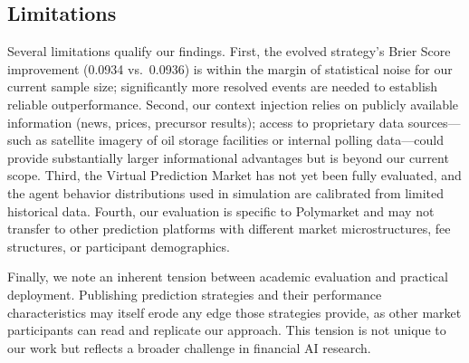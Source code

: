\subsection{Limitations}

Several limitations qualify our findings. First, the evolved strategy's Brier Score improvement (0.0934 vs.\ 0.0936) is within the margin of statistical noise for our current sample size; significantly more resolved events are needed to establish reliable outperformance. Second, our context injection relies on publicly available information (news, prices, precursor results); access to proprietary data sources---such as satellite imagery of oil storage facilities or internal polling data---could provide substantially larger informational advantages but is beyond our current scope. Third, the Virtual Prediction Market has not yet been fully evaluated, and the agent behavior distributions used in simulation are calibrated from limited historical data. Fourth, our evaluation is specific to Polymarket and may not transfer to other prediction platforms with different market microstructures, fee structures, or participant demographics.

Finally, we note an inherent tension between academic evaluation and practical deployment. Publishing prediction strategies and their performance characteristics may itself erode any edge those strategies provide, as other market participants can read and replicate our approach. This tension is not unique to our work but reflects a broader challenge in financial AI research.
